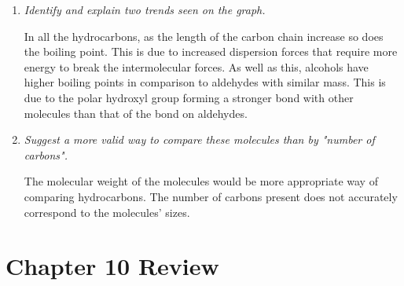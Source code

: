 \documentclass{report}
\begin{document}
\begin{enumerate}
\begin{enumerate}
				\item \textit{Identify and explain two trends seen on the graph.}

					In all the hydrocarbons, as the length of the carbon chain increase so does the boiling point. This is due to increased dispersion forces that require more energy to break the intermolecular forces. As well as this, alcohols have higher boiling points in comparison to aldehydes with similar mass. This is due to the polar hydroxyl group forming a stronger bond with other molecules than that of the  bond on aldehydes.

				\item \textit{Suggest a more valid way to compare these molecules than by "number of carbons".}

					The molecular weight of the molecules would be more appropriate way of comparing hydrocarbons. The number of carbons present does not accurately correspond to the molecules' sizes.
			\end{enumerate}

	\end{enumerate}

\newpage

\chapter*{Chapter 10 Review}
\end{document}
